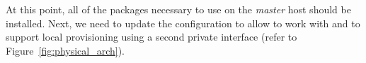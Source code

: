 At this point, all of the packages necessary to use \Warewulf{} on the {\em
master} host should be installed. Next, we need to update the configuration 
to allow \Warewulf{} to work with \baseOS{} and to
support local provisioning using a second private interface (refer to
Figure~\ref{fig:physical_arch}).
